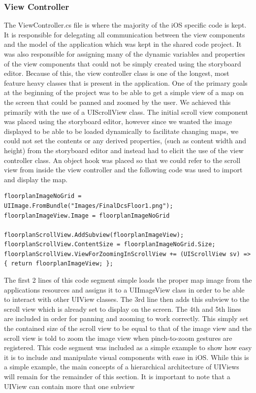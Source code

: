 \documentclass[main.tex]{subfiles}
\begin{document}
 




\subsubsection{View Controller}
The ViewController.cs file is where the majority of the iOS specific code is kept. It is responsible for delegating all communication between the view components and the model of the application which was kept in the shared code project. It was also responsible for assigning many of the dynamic variables and properties of the view components that could not be simply created using the storyboard editor. Because of this, the view controller class is one of the longest, most feature heavy classes that is present in the application. One of the primary goals at the beginning of the project was to be able to get a simple view of a map on the screen that could be panned and zoomed by the user. We achieved this primarily with the use of a UIScrollView class. The initial scroll view component was placed using the storyboard editor, however since we wanted the image displayed to be able to be loaded dynamically to facilitate changing maps, we could not set the contents or any derived properties, (such as content width and height) from the storyboard editor and instead had to elicit the use of the view controller class. An object hook was placed so that we could refer to the scroll view from inside the view controller and the following code was used to import and display the map.
\begin{lstlisting}
floorplanImageNoGrid = UIImage.FromBundle("Images/FinalDcsFloor1.png");
floorplanImageView.Image = floorplanImageNoGrid

floorplanScrollView.AddSubview(floorplanImageView);
floorplanScrollView.ContentSize = floorplanImageNoGrid.Size;
floorplanScrollView.ViewForZoomingInScrollView += (UIScrollView sv) => { return floorplanImageView; };
\end{lstlisting}
The first 2 lines of this code segment simple loads the proper map image from the applications resources and assigns it to a UIImageView class in order to be able to interact with other UIView classes. The 3rd line then adds this subview to the scroll view which is already set to display on the screen. The 4th and 5th lines are included in order for panning and zooming to work correctly. This simply set the contained size of the scroll view to be equal to that of the image view and the scroll view is told to zoom the image view when pinch-to-zoom gestures are registered. This code segment was included as a simple example to show how easy it is to include and manipulate visual components with ease in iOS. While this is a simple example, the main concepts of a hierarchical architecture of UIViews will remain for the remainder of this section. It is important to note that a UIView can contain more that one subview
\end{document}
